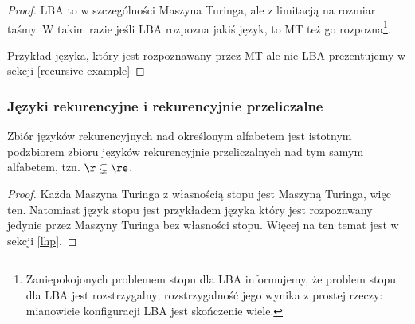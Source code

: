 \begin{proof}
LBA to w szczególności Maszyna Turinga, ale z limitacją na rozmiar taśmy. W takim razie jeśli LBA rozpozna jakiś język, to MT też go rozpozna\footnote{Zaniepokojonych problemem stopu dla LBA informujemy, że problem stopu dla LBA jest rozstrzygalny; rozstrzygalność jego wynika z prostej rzeczy: mianowicie konfiguracji LBA jest skończenie wiele.}.

Przykład języka, który jest rozpoznawany przez MT ale nie LBA prezentujemy w sekcji \ref{recursive-example}
\end{proof}

\subsubsection{Języki rekurencyjne i rekurencyjnie przeliczalne}
\begin{theorem}
Zbiór języków rekurencyjnych nad określonym alfabetem jest istotnym podzbiorem zbioru języków rekurencyjnie przeliczalnych nad tym samym alfabetem, tzn. \( \r \subsetneq \re \).
\end{theorem}

\begin{proof}
Każda Maszyna Turinga z własnością stopu jest Maszyną Turinga, więc ten. Natomiast język stopu jest przykładem języka który jest rozpoznwany jedynie przez Maszyny Turinga bez własności stopu. Więcej na ten temat jest w sekcji \ref{lhp}.
\end{proof}